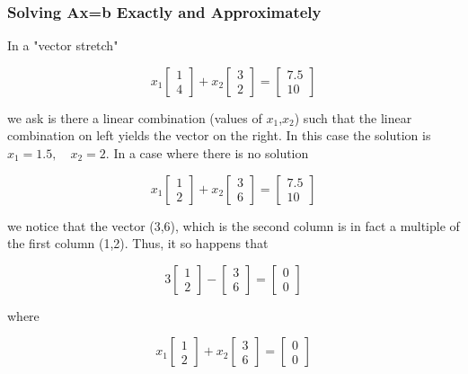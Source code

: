 \documentclass[main.tex]{subfiles}
\begin{document}
    \subsubsection{Solving Ax=b Exactly and Approximately}
    
    In a "vector stretch"
    
    $$x_{1}\left[\begin{array}{l}1 \\ 4\end{array}\right]+x_{2}\left[\begin{array}{l}3 \\ 2\end{array}\right]=\left[\begin{array}{r}7.5 \\ 10\end{array}\right]$$
    
    we ask is there a linear combination (values of $x_1$,$x_2$) such that the linear combination on left yields the vector on the right. In this case the solution is $x_{1}=1.5, \quad x_{2}=2$. In a case where there is no solution 
    
    $$x_{1}\left[\begin{array}{l}1 \\ 2\end{array}\right]+x_{2}\left[\begin{array}{l}3 \\ 6\end{array}\right]=\left[\begin{array}{r}7.5 \\ 10\end{array}\right]$$
    
    we notice that the vector (3,6), which is the second column is in fact a multiple of the first column (1,2). Thus, it so happens that
    
    $$3\left[\begin{array}{l}1 \\ 2\end{array}\right]-\left[\begin{array}{l}3 \\ 6\end{array}\right]=\left[\begin{array}{l}0 \\ 0\end{array}\right]$$
    
    where 
    
    $$x_{1}\left[\begin{array}{l}1 \\ 2\end{array}\right]+x_{2}\left[\begin{array}{l}3 \\ 6\end{array}\right]=\left[\begin{array}{l}0 \\ 0\end{array}\right]$$
    
\end{document}
